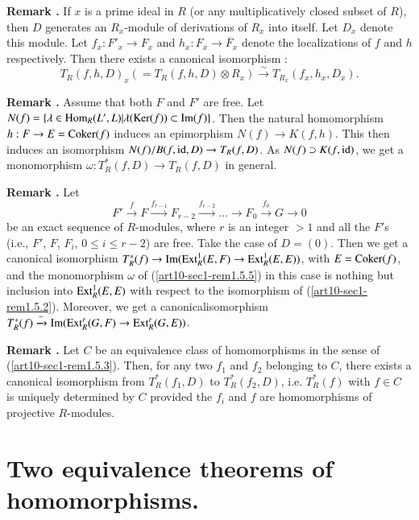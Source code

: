 \medskip
\noindent
{\bf Remark .\label{art10-sec1-rem1.5.4}}
If $x$ is a prime ideal in $R$ (or any multiplicatively closed subset of $R$), then $D$ generates an $R_{x}$-module of derivations of $R_{x}$ into itself. Let $D_{x}$ denote this module. Let $f_{x}:F'_{x}\to F_{x}$ and $h_{x}:F_{x}\to \overline{F}_{x}$ denote the localizations of $f$ and $h$ respectively. Then there exists a canonical isomorphism :
$$
T_{R}(f,h,D)_{x}(=T_{R}(f,h,D)\otimes R_{x})\xrightarrow{\sim}T_{R_{x}}(f_{x},h_{x},D_{x}).
$$

\medskip
\noindent
{\bf Remark .\label{art10-sec1-rem1.5.5}}
Assume that both $F$ and $F'$ are free. Let $N(f)=\{\lambda\in \operatorname{\mathrm{Hom}}_{R}(L',L)|\lambda(\operatorname{\mathrm{Ker}} (f))\subset \operatorname{\mathrm{Im}}(f)\}$. Then the natural homomorphism $h:F\to E=\operatorname{\mathrm{Coker}}(f)$ induces an epimorphism $N(f)\to K(f,h)$. This then induces an isomorphism $N(f)/B(f,\operatorname{\mathrm{id}},D)\to T_{R}(f,D)$. As $N(f)\supset K(f,\operatorname{\mathrm{id}})$, we get a monomorphism $\omega:T^{*}_{R}(f,D)\to T_{R}(f,D)$ in general.

\medskip
\noindent
{\bf Remark .\label{art10-sec1-rem1.5.6}}
Let
$$
F'\xrightarrow{f}F\xrightarrow{f_{r-1}}F_{r-2}\xrightarrow{f_{r-2}}\ldots\to F_{0}\xrightarrow{f_{0}}G\to 0
$$
be an exact sequence of $R$-modules, where $r$ is an integer $>1$ and all the $F'$s (i.e., $F'$, $F$, $F_{i}$, $0\leq i\leq r-2$) are free. Take the case of $D=(0)$. Then we get a canonical isomorphism $T^{*}_{R}(f)\to \operatorname{\mathrm{Im}} (\operatorname{\mathrm{Ext}}^{1}_{R}(E,F)\to \operatorname{\mathrm{Ext}}^{1}_{R}(E,E))$, with $E=\operatorname{\mathrm{Coker}} (f)$, and the monomorphism $\omega$ of (\ref{art10-sec1-rem1.5.5}) in this case is nothing but inclusion into $\operatorname{\mathrm{Ext}}^{1}_{R}(E,E)$ with respect to the isomorphism of (\ref{art10-sec1-rem1.5.2}). Moreover, we get a canonical\pageoriginale isomorphism $T^{*}_{R}(f)\xrightarrow{\sim}\operatorname{\mathrm{Im}}(\operatorname{\mathrm{Ext}}^{r}_{R}(G,F)\to \operatorname{\mathrm{Ext}}^{r}_{R}(G,E))$.

\medskip
\noindent
{\bf Remark .\label{art10-sec1-rem1.5.7}}
Let $C$ be an equivalence class of homomorphisms in the sense of (\ref{art10-sec1-rem1.5.3}). Then, for any two $f_{1}$ and $f_{2}$ belonging to $C$, there exists a canonical isomorphism from $T^{*}_{R}(f_{1},D)$ to $T^{*}_{R}(f_{2},D)$, i.e. $T^{*}_{R}(f)$ with $f\in C$ is uniquely determined by $C$ provided the $f_{i}$ and $f$ are homomorphisms of projective $R$-modules.

\section{Two equivalence theorems of homomorphisms.}\label{art10-sec2}

